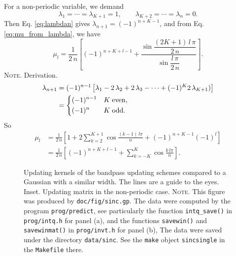 \documentclass[reprint, superscriptaddress, floatfix]{revtex4-1}
\newcommand{\note}[1]{{\color{DarkGreen}\footnotesize \textsc{Note.} #1}}
\begin{document}
For a non-periodic variable, we demand
$$
\lambda_1 = \cdots = \lambda_{K+1} = 1,
\qquad
\lambda_{K+2} = \cdots = \lambda_n = 0.
$$
Then Eq. \eqref{eq:lambdan} gives
$\lambda_{n+1} = (-1)^{n+K-1}$,
and from Eq. \eqref{eq:mu_from_lambda},
we have
\begin{equation}
  \mu_l
  =
  \frac{1}{2 \, n}
  \left[
    (-1)^{n+K+l-1}
    +
    \frac{
      \sin
      \dfrac{ (2 K + 1) \, l \, \pi }
           {         2 \, n        }
    }
    {
      \sin \dfrac{ l \, \pi } { 2 \, n }
    }
  \right]
  .
\label{eq:mu_sinc_refl}
\end{equation}
\note{Derivation.
$$
\begin{aligned}
  \lambda_{n+1}
  &=
  (-1)^{n-1}
  \left[
    \lambda_1
    - 2 \, \lambda_2
    + 2 \, \lambda_3 - \cdots
    + (-1)^{K} 2 \, \lambda_{K+1})
  \right]
  \\
  &=
  \begin{dcases}
    (-1)^{n-1} & K \mathrm{\; even,} \\
    (-1)^n     & K \mathrm{\; odd.}
  \end{dcases}
\end{aligned}
$$
So
$$
\begin{aligned}
  \mu_l
  &=
  \frac{1}{2\,n}
  \left[
    1 +
    2 \sum_{k=2}^{K+1}
    \cos \frac { (k - 1) \, l \pi } { n }
    +
    (-1)^{n+K-1} (-1)^l
  \right]
  \\
  &=
  \frac{1}{2\,n}
  \left[
    (-1)^{n+K+l-1}
    +
    \sum_{k=-K}^{K}
    \cos \frac { k \, l \pi } { n }
  \right]
  .
\end{aligned}
$$
}%


\begin{figure}[h]
\begin{center}
  \caption{
    \label{fig:sinc}
    Updating kernels of the bandpass updating schemes
    compared to a Gaussian with a similar width.
    The lines are a guide to the eyes.
    Inset. Updating matrix in the non-periodic case.
    \note{This figure was produced by \texttt{doc/fig/sinc.gp}.
      The data were computed by the program \texttt{prog/predict},
      see particularly the function \texttt{intq\_save()}
      in \texttt{prog/intq.h} for panel (a),
      and the functions \texttt{savewin()}
      and \texttt{savewinmat()}
      in \texttt{prog/invt.h} for panel (b),
      The data were saved under the directory \texttt{data/sinc}.
      See the \texttt{make} object \texttt{sincsingle}
      in the \texttt{Makefile} there.
    }%
  }
\end{center}
\end{figure}
\end{document}
